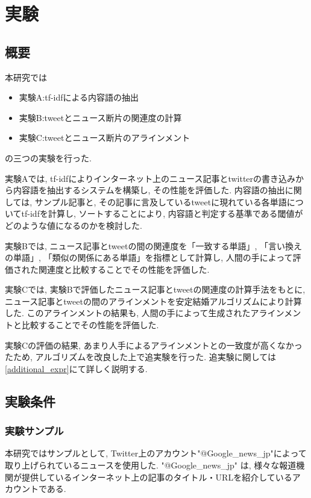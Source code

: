 \documentclass[12pt]{jarticle}
\begin{document}

\section{実験}
\def\googlenews{Google\_news\_jp}
\subsection{概要}

本研究では
\begin{itemize}
\item 実験A:tf-idfによる内容語の抽出
\item 実験B:tweetとニュース断片の関連度の計算
\item 実験C:tweetとニュース断片のアラインメント
\end{itemize}
の三つの実験を行った.

実験Aでは, tf-idfによりインターネット上のニュース記事とtwitterの書き込みから内容語を抽出するシステムを構築し, その性能を評価した.
内容語の抽出に関しては, サンプル記事と, その記事に言及しているtweetに現れている各単語についてtf-idfを計算し, ソートすることにより, 内容語と判定する基準である閾値がどのような値になるのかを検討した.

実験Bでは, ニュース記事とtweetの間の関連度を「一致する単語」, 「言い換えの単語」, 「類似の関係にある単語」を指標として計算し, 人間の手によって評価された関連度と比較することでその性能を評価した.

実験Cでは, 実験Bで評価したニュース記事とtweetの関連度の計算手法をもとに, ニュース記事とtweetの間のアラインメントを安定結婚アルゴリズムにより計算した.
このアラインメントの結果も, 人間の手によって生成されたアラインメントと比較することでその性能を評価した.

実験Cの評価の結果, あまり人手によるアラインメントとの一致度が高くなかったため, アルゴリズムを改良した上で追実験を行った. 追実験に関しては\ref{additional_expr}にて詳しく説明する.

\subsection{実験条件}
\subsubsection{実験サンプル}
本研究ではサンプルとして, Twitter上のアカウント"@\googlenews "によって取り上げられているニュースを使用した.
"@\googlenews" は, 様々な報道機関が提供しているインターネット上の記事のタイトル・URLを紹介しているアカウントである.
\end{document}
